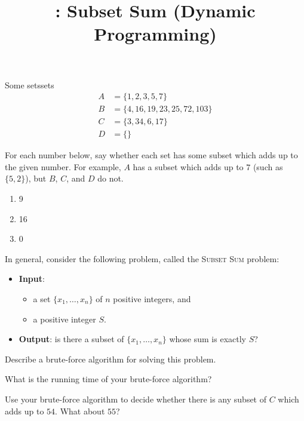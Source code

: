 \documentclass{tufte-handout}
\title{\thecourse: Subset Sum (Dynamic Programming)}
\date{}
\begin{document}
\maketitle

\begin{model*}{Some sets}{sets}
  \begin{align*}
    A &= \{ 1, 2, 3, 5, 7 \} \\
    B &= \{ 4, 16, 19, 23, 25, 72, 103 \} \\
    C &= \{ 3, 34, 6, 17 \} \\
    D &= \{ \}
  \end{align*}
\end{model*}

\begin{questions}
\item For each number below, say whether each set has some subset
  which adds up to the given number.  For example, $A$ has a
  subset which adds up to $7$ (such as $\{5,2\}$),
  but $B$, $C$, and $D$ do not.
  \begin{enumerate}[label=(\alph*)]
  \item 9
  \item 16
  \item 0
  \end{enumerate}
\end{questions}

In general, consider the following problem, called the \textsc{Subset Sum}
problem:
\begin{itemize}
\item \textbf{Input}:
  \begin{itemize}
  \item a set $\{x_1, \dots, x_n\}$ of $n$ positive
    integers, and
  \item a positive integer $S$.
  \end{itemize}

\item \textbf{Output}: is there a subset of $\{x_1, \dots, x_n\}$
  whose sum is exactly $S$?
\end{itemize}

\begin{questions}
\item Describe a brute-force algorithm for solving this problem.
\item \label{q:brute} What is the running time of your brute-force
  algorithm? 
\item Use your brute-force algorithm to decide whether there is any
  subset of $C$ which adds up to $54$.  What about $55$?
\end{questions}
\end{document}

